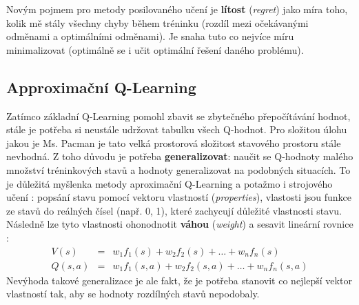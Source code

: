 Novým pojmem pro metody posilovaného učení je \textbf{lítost} (\textit{regret}) jako míra toho, kolik mě stály všechny chyby během tréninku (rozdíl mezi očekávanými odměnami a optimálními odměnami). Je snaha tuto co nejvíce míru minimalizovat (optimálně se i učit optimální řešení daného problému).

\subsection*{Approximační Q-Learning}
Zatímco základní Q-Learning pomohl zbavit se zbytečného přepočítávání hodnot, stále je potřeba si neustále udržovat tabulku všech Q-hodnot. Pro složitou úlohu jakou je Ms. Pacman je tato velká prostorová složitost stavového prostoru stále nevhodná. Z toho důvodu je potřeba \textbf{generalizovat}: naučit se Q-hodnoty malého množství tréninkových stavů a hodnoty generalizovat na podobných situacích. To je důležitá myšlenka metody aproximační Q-Learning a potažmo i strojového učení \cite{RLAprox}:
\newline
popsání stavu pomocí vektoru vlastností (\textit{properties}), vlastosti jsou funkce ze stavů do reálných čísel (např. 0, 1), které zachycují důležité vlastnosti stavu. Následně lze tyto vlastnosti ohonodnotit \textbf{váhou} (\textit{weight}) a sesavit lineární rovnice \cite{RLAprox}:
\begin{eqnarray}
V(s) &=& w_1f_1(s) + w_2f_2(s) + \dots + w_nf_n(s) \\
Q(s,a) &=& w_1f_1(s,a) + w_2f_2(s,a) + \dots + w_nf_n(s,a)
\end{eqnarray}
Nevýhoda takové generalizace je ale fakt, že je potřeba stanovit co nejlepší vektor vlastností tak, aby se hodnoty rozdílných stavů nepodobaly.
